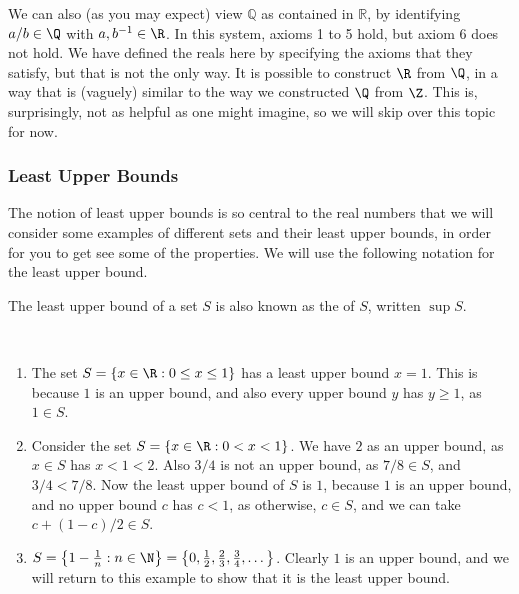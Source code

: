 We can also (as you may expect) view $\mathbb{Q}$ as contained in $\mathbb{R}$, by identifying $a/b \in \Q$ with $a, b^{-1} \in \R$. In this system, axioms 1 to 5 hold, but axiom 6 does not hold.
We have defined the reals here by specifying the axioms that they satisfy, but that is not the only way. It is possible to construct $\R$ from $\Q$, in a way that is (vaguely) similar to the way we constructed $\Q$ from $\Z$. This is, surprisingly, not as helpful as one might imagine, so we will skip over this topic for now.

\subsubsection{Least Upper Bounds}

The notion of least upper bounds is so central to the real numbers that we will consider some examples of different sets and their least upper bounds, in order for you to get see some of the properties. We will use the following notation for the least upper bound.

\begin{definition}[Supremum]
	The least upper bound of a set $S$ is also known as the  of $S$, written $\sup S$.
\end{definition}

\begin{example}~
    \vspace*{-\baselineskip}
\begin{enumerate}
	\item The set $S = \{x \in \R : 0 \leq x \leq 1\}$ has a least upper bound $x = 1$. This is because $1$ is an upper bound, and also every upper bound $y$ has $y \geq 1$, as $1 \in S$.
	\item Consider the set $S = \{ x \in \R : 0 < x < 1\}$. We have $2$ as an upper bound, as $x \in S$ has $x < 1 < 2$. Also $3/4$ is not an upper bound, as $7/8 \in S$, and $3/4 < 7/8$. Now the least upper bound of $S$ is $1$, because $1$ is an upper bound, and no upper bound $c$ has $c < 1$, as otherwise, $c \in S$, and we can take $c + (1 - c)/2 \in S$.
	\item $S = \left\{1 - \frac{1}{n}  : n \in \N \right\} = \left\{0, \frac{1}{2}, \frac{2}{3}, \frac{3}{4}, \dots \right\}$. Clearly $1$ is an upper bound, and we will return to this example to show that it is the least upper bound.
\end{enumerate}
\end{example}

